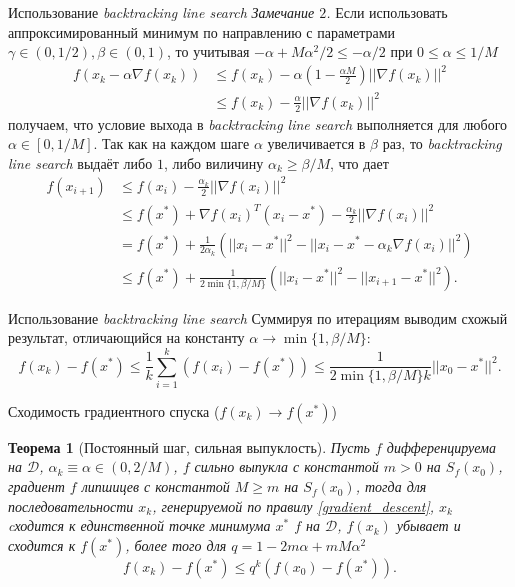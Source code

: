 \documentclass[10pt]{beamer}
\newtheorem{theorem_ru}{Теорема}[]
\begin{document}
\begin{frame}{Использование \textit{backtracking line search}}
\textit{Замечание $2$.} Если использовать аппроксимированный минимум по направлению 
с параметрами $\gamma\in(0, 1/2), \beta\in(0,1)$, то учитывая $-\alpha+M\alpha^2/2\leq -\alpha/2$ при $0\leq \alpha\leq 1/M$ 
\begin{align*}
f(x_k-\alpha\nabla f(x_k))&\leq f(x_k)-\alpha\left(1-\frac{\alpha M}{2}\right)||\nabla f(x_k)||^2\\
&\leq f(x_k)-\frac{\alpha}{2}||\nabla f(x_k)||^2
\end{align*}
получаем, что условие выхода в \textit{backtracking line search} выполняется для любого $\alpha\in [0, 1/M]$. Так как
на каждом шаге $\alpha$ увеличивается в $\beta$ раз, то \textit{backtracking line search} выдаёт либо $1$, либо
виличину $\alpha_k\geq \beta/M$, что дает
\begin{align*}
f(x_{i+1}) & \leq f(x_i)-\frac{\alpha_k}{2}||\nabla f(x_i)||^2 \\
& \leq f(x^*)+\nabla f(x_i)^T(x_i-x^*)-\frac{\alpha_k}{2}||\nabla f(x_i)||^2 \\
& =f(x^*)+\frac{1}{2\alpha_k}\left(||x_i-x^*||^2-||x_i-x^*-\alpha_k \nabla f(x_i)||^2\right) \\
&\leq 
f(x^*)+\frac{1}{2\min\{1, \beta/M\}}\left(||x_i-x^*||^2-||x_{i+1}-x^*||^2\right).
\end{align*}

\end{frame}

\begin{frame}{Использование \textit{backtracking line search}}
Суммируя по итерациям выводим схожый результат, отличающийся на константу $\alpha\rightarrow \min\{1, \beta/M\}$:
$$
f(x_k)-f(x^*)\leq \frac{1}{k}\sum_{i=1}^k(f(x_i)-f(x^*))\leq \frac{1}{2\min\{1, \beta/M\} k}||x_0-x^*||^2.
$$
\end{frame}

\begin{frame}{Сходимость градиентного спуска ($f(x_k)\rightarrow f(x^*)$)}
\begin{theorem_ru}[Постоянный шаг, сильная выпуклость] Пусть $f$ дифференцируема на $\mathcal{D}$, $\alpha_k\equiv \alpha\in (0, 2/M)$, $f$ сильно выпукла с константой $m>0$ на $S_f(x_0)$, градиент $f$ липшицев с константой $M\geq m$ на $S_f(x_0)$, тогда для последовательности $x_k$, генерируемой по правилу \eqref{gradient_descent},
$x_k$ cходится к единственной точке минимума $x^*$ $f$ на $\mathcal{D}$, $f(x_k)$ убывает и сходится к $f(x^*)$, более того для $q=1-2m\alpha+mM\alpha^2$
$$
f(x_k)-f(x^*)\leq q^k(f(x_0)-f(x^*)).
$$
\end{theorem_ru}
\end{frame}
\end{document}
